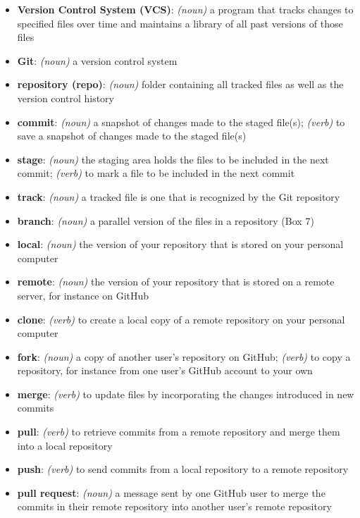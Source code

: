 \documentclass[10pt]{article}
\begin{document}
\begin{itemize}
\item \textbf{Version Control System (VCS)}: \textit{(noun)} a program that tracks changes to specified files over time and maintains a library of all past versions of those files 
\item \textbf{Git}: \textit{(noun)} a version control system
\item \textbf{repository (repo)}: \textit{(noun)} folder containing all tracked files as well as the version control history
\item \textbf{commit}: \textit{(noun)} a snapshot of changes made to the staged file(s); \textit{(verb)} to save a snapshot of changes made to the staged file(s) 
\item \textbf{stage}: \textit{(noun)} the staging area holds the files to be included in the next commit; \textit{(verb)} to mark a file to be included in the next commit
\item \textbf{track}: \textit{(noun)} a tracked file is one that is recognized by the Git repository
\item \textbf{branch}: \textit{(noun)} a parallel version of the files in a repository (Box 7)
\item \textbf{local}: \textit{(noun)} the version of your repository that is stored on your personal computer
\item \textbf{remote}: \textit{(noun)} the version of your repository that is stored on a remote server, for instance on GitHub
\item \textbf{clone}: \textit{(verb)} to create a local copy of a remote repository on your personal computer
\item \textbf{fork}: \textit{(noun)} a copy of another user's repository on GitHub; \textit{(verb)} to copy a repository, for instance from one user's GitHub account to your own
\item \textbf{merge}: \textit{(verb)} to update files by incorporating the changes introduced in new commits
\item \textbf{pull}: \textit{(verb)} to retrieve commits from a remote repository and merge them into a local repository
\item \textbf{push}: \textit{(verb)} to send commits from a local repository to a remote repository
\item \textbf{pull request}: \textit{(noun)} a message sent by one GitHub user to merge the commits in their remote repository into another user's remote repository
\end{itemize}
\end{document}
